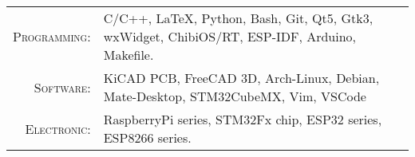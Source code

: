 %
%



\renewcommand{\arraystretch}{1.1}

	\begin{tabular}{>{}r>{}p{13cm}}
		\textsc{Programming:} &  C/C++, \LaTeX, Python, Bash, Git, Qt5, Gtk3, wxWidget, ChibiOS/RT, ESP-IDF, Arduino, Makefile.\\
		\textsc{Software:}    &  KiCAD PCB, FreeCAD 3D, Arch-Linux, Debian, Mate-Desktop, STM32CubeMX, Vim, VSCode\\
		\textsc{Electronic:}  &  RaspberryPi series, STM32Fx chip, ESP32 series, ESP8266 series.\\
	\end{tabular}